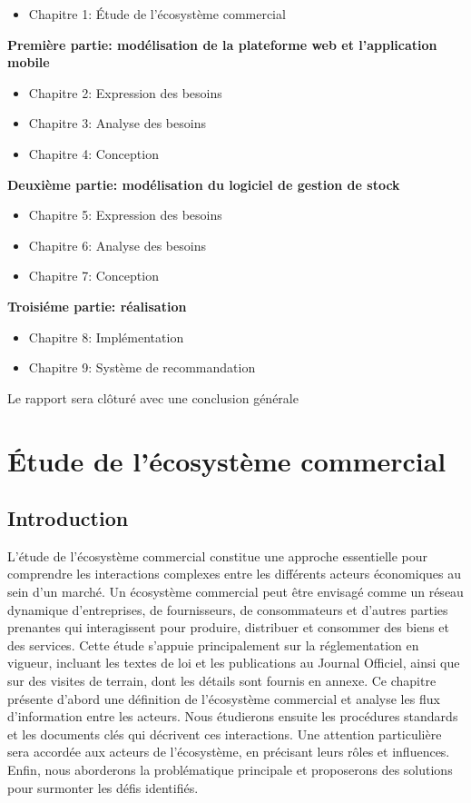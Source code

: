 \documentclass[edit,12pt,a4paper,ChapStyle,oneside,doubleinterligne]{report}
\begin{document}
\begin{itemize}
    \item Chapitre 1: Étude de l'écosystème commercial
\end{itemize}



{\noindent\textbf{Première partie: modélisation de la plateforme web et l'application mobile}\par}

\begin{itemize}
    \item Chapitre 2: Expression des besoins
    \item Chapitre 3: Analyse des besoins 
    \item Chapitre 4: Conception
\end{itemize}
\textbf{Deuxième partie: modélisation du logiciel de gestion de stock}
\begin{itemize}
    \item Chapitre 5: Expression des besoins
    \item Chapitre 6: Analyse des besoins 
    \item Chapitre 7: Conception
\end{itemize}
\textbf{Troisiéme partie: réalisation}
\begin{itemize}
    \item Chapitre 8: Implémentation
    \item Chapitre 9: Système de recommandation 
\end{itemize}
Le rapport sera clôturé avec une conclusion générale


\chapter{Étude de l'écosystème commercial}
\newpage
\section{Introduction}
L'étude de l'écosystème commercial constitue une approche essentielle pour comprendre les interactions complexes entre les différents acteurs économiques au sein d'un marché. Un écosystème commercial peut être envisagé comme un réseau dynamique d'entreprises, de fournisseurs, de consommateurs et d'autres parties prenantes qui interagissent pour produire, distribuer et consommer des biens et des services.
\newline Cette étude s'appuie principalement sur la réglementation en vigueur, incluant les textes de loi et les publications au Journal Officiel, ainsi que sur des visites de terrain, dont les détails sont fournis en annexe.
\newline Ce chapitre présente d'abord une définition de l'écosystème commercial et analyse les flux d'information entre les acteurs. Nous étudierons ensuite les procédures standards et les documents clés qui décrivent ces interactions. Une attention particulière sera accordée aux acteurs de l'écosystème, en précisant leurs rôles et influences.
\newline Enfin, nous aborderons la problématique principale et proposerons des solutions pour surmonter les défis identifiés.
\end{document}
